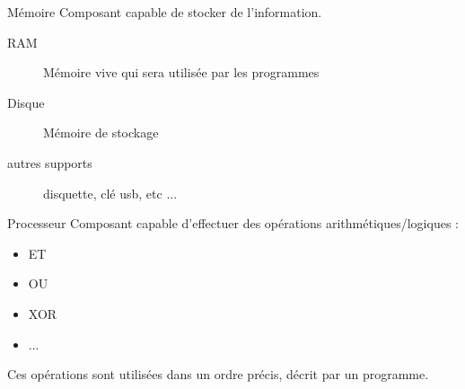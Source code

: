 \begin{frame}{Mémoire}
    Composant capable de stocker de l'information.
    \begin{description}
        \item[RAM] Mémoire vive qui sera utilisée par les programmes
        \item[Disque] Mémoire de stockage
        \item[autres supports] disquette, clé usb, etc ...
    \end{description}
\end{frame}

\begin{frame}{Processeur}
    Composant capable d'effectuer des opérations arithmétiques/logiques :
    \begin{itemize}
        \item ET
        \item OU
        \item XOR
        \item ...
    \end{itemize}
    Ces opérations sont utilisées dans un ordre précis, décrit par un programme.
\end{frame}

